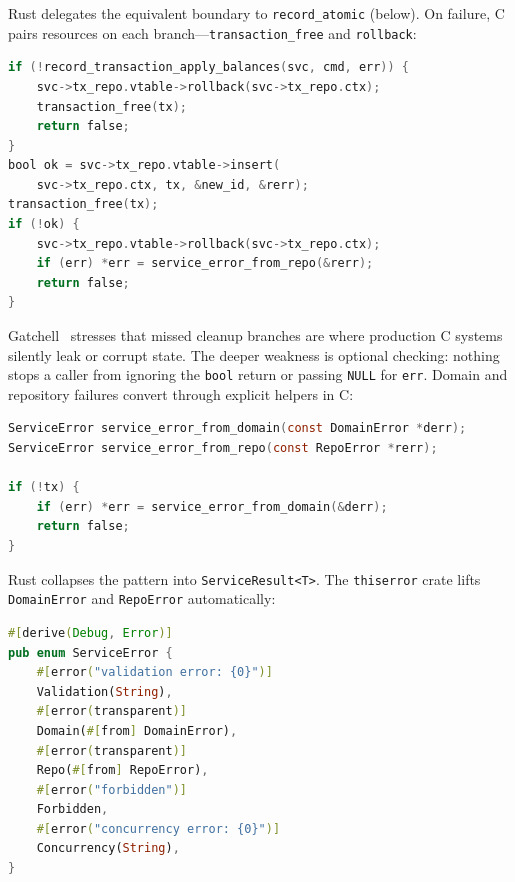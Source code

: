 Rust delegates the equivalent boundary to \texttt{record\_atomic} (below). On failure,
C pairs resources on each branch---\texttt{transaction\_free} and \texttt{rollback}:

\noindent\begin{minipage}{\linewidth}
\begin{lstlisting}[language=C, caption={transaction\_service.c --- Error paths free
the in-memory row and roll back the SQL transaction.}]
if (!record_transaction_apply_balances(svc, cmd, err)) {
    svc->tx_repo.vtable->rollback(svc->tx_repo.ctx);
    transaction_free(tx);
    return false;
}
bool ok = svc->tx_repo.vtable->insert(
    svc->tx_repo.ctx, tx, &new_id, &rerr);
transaction_free(tx);
if (!ok) {
    svc->tx_repo.vtable->rollback(svc->tx_repo.ctx);
    if (err) *err = service_error_from_repo(&rerr);
    return false;
}
\end{lstlisting}\end{minipage}

Gatchell~\cite{Gatchell2003} stresses that missed cleanup branches are where production
C systems silently leak or corrupt state. The deeper weakness is optional checking: nothing
stops a caller from ignoring the \texttt{bool} return or passing \texttt{NULL} for
\texttt{err}. Domain and repository failures convert through explicit helpers in C:

\begin{lstlisting}[language=C, caption={service\_error.c / call sites --- Manual
enum lift on every branch.}]
ServiceError service_error_from_domain(const DomainError *derr);
ServiceError service_error_from_repo(const RepoError *rerr);

if (!tx) {
    if (err) *err = service_error_from_domain(&derr);
    return false;
}
\end{lstlisting}

Rust collapses the pattern into \texttt{ServiceResult<T>}. The \texttt{thiserror} crate
lifts \texttt{DomainError} and \texttt{RepoError} automatically:

\begin{lstlisting}[language=Rust, caption={errors.rs --- \texttt{\#[from]} replaces
manual conversion helpers.}]
#[derive(Debug, Error)]
pub enum ServiceError {
    #[error("validation error: {0}")]
    Validation(String),
    #[error(transparent)]
    Domain(#[from] DomainError),
    #[error(transparent)]
    Repo(#[from] RepoError),
    #[error("forbidden")]
    Forbidden,
    #[error("concurrency error: {0}")]
    Concurrency(String),
}
\end{lstlisting}

